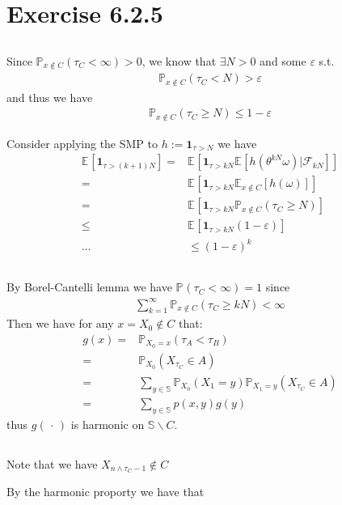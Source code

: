 \documentclass[11pt,a4paper]{ctexart}
\numberwithin{equation}{section}%
\newcommand{\F}{\mathcal{F}}
\begin{document}
\section{Exercise 6.2.5}


\subsection{}

Since $ \mathbb{P}_{ x\not\in C }\left( \tau_C <\infty \right) >0  $, we know that $ \exists N>0 $ and some $ \varepsilon  $ s.t. 
\begin{align*}
    \mathbb{P}_{ x\not\in C }\left( \tau_C <N \right) >\varepsilon 
\end{align*}
and thus we have
\begin{align*}
    \mathbb{P}_{ x\not\in C }\left( \tau_C \geq N \right) \leq 1-\varepsilon  
\end{align*}


Consider applying the SMP to $ h:= \mathbf{1}_{\tau >N} $ we have
\begin{align*}
    \mathbb{E}_{  }\left[ \mathbf{1}_{\tau > (k+1)N} \right] =& \mathbb{E}_{  }\left[ \mathbf{1}_{\tau > kN} \mathbb{E}_{  }\left[ h(\theta ^{kN}\omega ) | \F_{kN} \right] \right] \\  
    =& \mathbb{E}_{  }\left[ \mathbf{1}_{\tau > kN} \mathbb{E}_{ x\not\in C }\left[ h(\omega ) \right] \right] \\
    =& \mathbb{E}_{  }\left[ \mathbf{1}_{\tau > kN} \mathbb{P}_{ x\not\in C }\left( \tau_C \geq N \right) \right] \\
    \leq& \mathbb{E}_{  }\left[ \mathbf{1}_{\tau > kN} (1-\varepsilon ) \right] \\
    \ldots& \leq (1-\varepsilon )^k
\end{align*}




\subsection{}

By Borel-Cantelli lemma we have $ \mathbb{P}_{  }\left( \tau_C<\infty \right) =1  $ since
\begin{align*}
    \sum_{k=1}^\infty \mathbb{P}_{ x\not\in C }\left( \tau_C \geq kN \right) <\infty 
\end{align*}
Then we have for any $ x=X_0\not\in C $ that:
\begin{align*}
    g(x)=& \mathbb{P}_{ X_0=x }\left( \tau_A<\tau_B \right)  \\
    =& \mathbb{P}_{ X_0 }\left( X_{\tau_C} \in A \right)\\
    =& \sum_{y\in \mathbb{S}} \mathbb{P}_{ X_0 }\left( X_1 = y \right) \mathbb{P}_{ X_1=y }\left( X_{\tau_C} \in A \right) \\
    =& \sum_{y\in \mathbb{S}} p(x,y)g(y)
\end{align*}
thus $ g(\, \cdot \, ) $ is harmonic on $ \mathbb{S}\backslash C $.


\subsection{}

Note that we have $ X_{n\wedge \tau_C - 1}\not\in C$

By the harmonic proporty we have that 
\begin{align*}
    
\end{align*}
\end{document}

